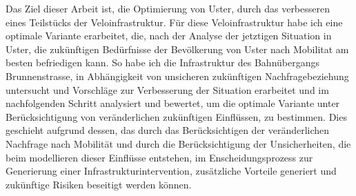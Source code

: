 Das Ziel dieser Arbeit ist, die Optimierung von Uster, durch das verbesseren eines Teilstücks der Veloinfrastruktur. Für diese Veloinfrastruktur habe ich eine optimale Variante erarbeitet, die, nach der Analyse der jetztigen Situation in Uster, die zukünftigen Bedürfnisse der Bevölkerung von Uster nach Mobilitat am besten befriedigen kann. So habe ich die Infrastruktur des Bahnübergangs Brunnenstrasse, in Abhängigkeit von unsicheren zukünftigen Nachfragebeziehung untersucht und Vorschläge zur Verbesserung der Situation erarbeitet und im nachfolgenden Schritt analysiert und bewertet, um die optimale Variante unter Berücksichtigung von veränderlichen zukünftigen Einflüssen, zu bestimmen. Dies geschieht aufgrund dessen, das durch das Berücksichtigen der veränderlichen Nachfrage nach Mobilität und durch die Berücksichtigung der Unsicherheiten, die beim modellieren dieser Einflüsse entstehen, im Enscheidungsprozess zur Generierung einer Infrastrukturintervention, zusätzliche Vorteile generiert und zukünftige Risiken beseitigt werden können.



%

